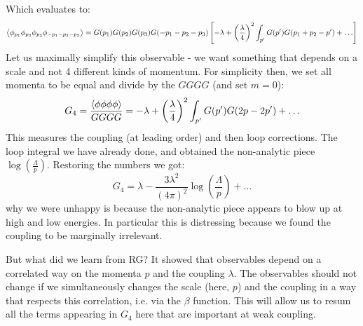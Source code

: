 Which evaluates to:
\begin{equation}
    \left< \phi_{p_1}\phi_{p_2}\phi_{p_3}\phi_{-p_1-p_2-p_3} \right> = G(p_1)G(p_2)G(p_3)G(-p_1-p_2-p_3)\left[-\lambda + \left(\frac{\lambda}{4}\right)^2\int_{p'}G(p')G(p_1 + p_2 - p') + \ldots \right]
\end{equation}
Let us maximally simplify this observable - we want something that depends on a scale and not 4 different kinds of momentum. For simplicity then, we set all momenta to be equal and divide by the $GGGG$ (and set $m = 0$):
\begin{equation}
    G_4 = \frac{\left< \phi\phi\phi\phi \right>}{GGGG} = -\lambda + \left(\frac{\lambda}{4}\right)^2\int_{p'}G(p')G(2p - 2p') + \ldots
\end{equation}
This measures the coupling (at leading order) and then loop corrections. The loop integral we have already done, and obtained the non-analytic piece $\log(\frac{\Lambda}{p})$. Restoring the numbers we got:
\begin{equation}
    G_4 = \lambda - \frac{3\lambda^2}{(4\pi)^2}\log(\frac{\Lambda}{p}) + \ldots
\end{equation}
why we were unhappy is because the non-analytic piece appears to blow up at high and low energies. In particular this is distressing because we found the coupling to be marginally irrelevant.

But what did we learn from RG? It showed that observables depend on a correlated way on the momenta $p$ and the coupling $\lambda$. The observables should not change if we simultaneously changes the scale (here, $p$) and the coupling in a way that respects this correlation, i.e. via the $\beta$ function. This will allow us to resum all the terms appearing in $G_4$ here that are important at weak coupling.

